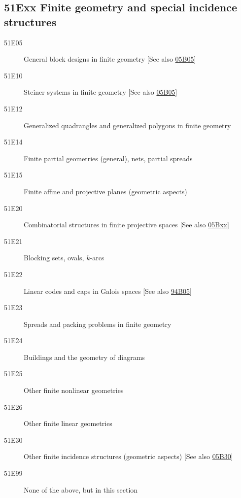 \documentclass[letterpaper]{article}
\begin{document}
\subsection*{51Exx  Finite geometry and special incidence structures }\label{51Exx}
\begin{description}  
\item [51E05]\label{51E05} General block designs in finite geometry [See also \hyperref[05B05]{05B05}]
\item [51E10]\label{51E10} Steiner systems in finite geometry [See also \hyperref[05B05]{05B05}]
\item [51E12]\label{51E12} Generalized quadrangles and generalized polygons in finite geometry
\item [51E14]\label{51E14} Finite partial geometries (general), nets, partial spreads
\item [51E15]\label{51E15} Finite affine and projective planes (geometric aspects)
\item [51E20]\label{51E20} Combinatorial structures in finite projective spaces [See also \hyperref[05Bxx]{05Bxx}]
\item [51E21]\label{51E21} Blocking sets, ovals, $k$-arcs
\item [51E22]\label{51E22} Linear codes and caps in Galois spaces [See also \hyperref[94B05]{94B05}]
\item [51E23]\label{51E23} Spreads and packing problems in finite geometry
\item [51E24]\label{51E24} Buildings and the geometry of diagrams
\item [51E25]\label{51E25} Other finite nonlinear geometries
\item [51E26]\label{51E26} Other finite linear geometries
\item [51E30]\label{51E30} Other finite incidence structures (geometric aspects) [See also \hyperref[05B30]{05B30}]
\item [51E99]\label{51E99} None of the above, but in this section
\end{description}
\end{document}
